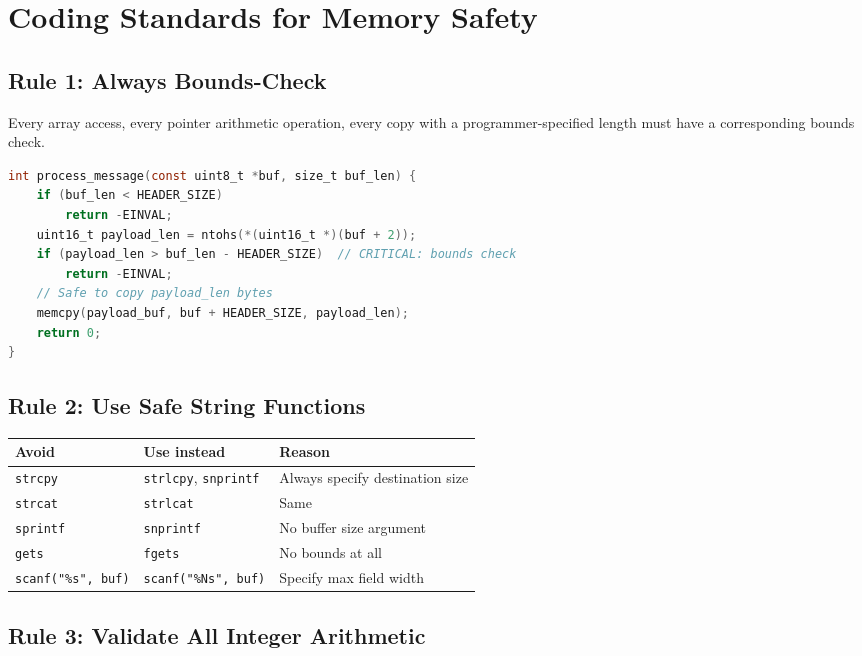 \section{Coding Standards for Memory Safety}

\subsection{Rule 1: Always Bounds-Check}

Every array access, every pointer arithmetic operation, every copy with a programmer-specified length must have a corresponding bounds check.

\begin{lstlisting}[language=C, caption=Bounds checking pattern]
int process_message(const uint8_t *buf, size_t buf_len) {
    if (buf_len < HEADER_SIZE)
        return -EINVAL;
    uint16_t payload_len = ntohs(*(uint16_t *)(buf + 2));
    if (payload_len > buf_len - HEADER_SIZE)  // CRITICAL: bounds check
        return -EINVAL;
    // Safe to copy payload_len bytes
    memcpy(payload_buf, buf + HEADER_SIZE, payload_len);
    return 0;
}
\end{lstlisting}

\subsection{Rule 2: Use Safe String Functions}

\begin{longtable}{p{3cm}p{5cm}p{4cm}}
	\toprule
	\textbf{Avoid}             & \textbf{Use instead}                & \textbf{Reason}                 \\
	\midrule
	\texttt{strcpy}            & \texttt{strlcpy}, \texttt{snprintf} & Always specify destination size \\
	\texttt{strcat}            & \texttt{strlcat}                    & Same                            \\
	\texttt{sprintf}           & \texttt{snprintf}                   & No buffer size argument         \\
	\texttt{gets}              & \texttt{fgets}                      & No bounds at all                \\
	\texttt{scanf("\%s", buf)} & \texttt{scanf("\%Ns", buf)}         & Specify max field width         \\
	\bottomrule
\end{longtable}

\subsection{Rule 3: Validate All Integer Arithmetic}

